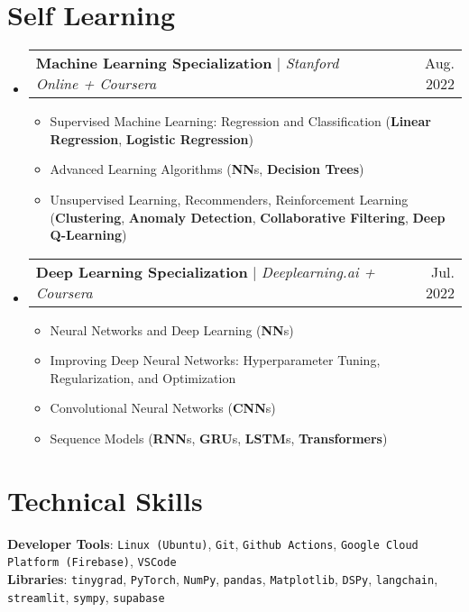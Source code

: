 \documentclass[letterpaper,11pt]{article}
\makeatletter
\newcommand{\resumeItem}[1]{
  \item\small{
    {#1 \vspace{-2pt}}
  }
}
\newcommand{\resumeProjectHeading}[2]{
    \item
    \begin{tabular*}{0.97\textwidth}{l@{\extracolsep{\fill}}r}
      \small#1 & #2 \\
    \end{tabular*}\vspace{-7pt}
}
\newcommand{\resumeSubHeadingListStart}{\begin{itemize}[leftmargin=0.15in, label={}]}
\newcommand{\resumeSubHeadingListEnd}{\end{itemize}}
\newcommand{\resumeItemListStart}{\begin{itemize}}
\newcommand{\resumeItemListEnd}{\end{itemize}\vspace{-5pt}}
\makeatother
\begin{document}
\section{Self Learning}
    \resumeSubHeadingListStart
      \resumeProjectHeading
          {\textbf{Machine Learning Specialization} $|$ \emph{Stanford Online + Coursera}}{Aug. 2022}
          \resumeItemListStart
                \resumeItem {Supervised Machine Learning: Regression and Classification (\textbf{Linear Regression}, \textbf{Logistic Regression})}
                \resumeItem {Advanced Learning Algorithms (\textbf{NN}s, \textbf{Decision Trees})}
                \resumeItem {Unsupervised Learning, Recommenders, Reinforcement Learning (\textbf{Clustering}, \textbf{Anomaly Detection}, \textbf{Collaborative Filtering}, \textbf{Deep Q-Learning})}
          \resumeItemListEnd
      \resumeProjectHeading
          {\textbf{Deep Learning Specialization} $|$ \emph{Deeplearning.ai + Coursera}}{Jul. 2022}
          \resumeItemListStart
                \resumeItem {Neural Networks and Deep Learning (\textbf{NN}s)}
                \resumeItem {Improving Deep Neural Networks: Hyperparameter Tuning, Regularization, and Optimization}
                \resumeItem {Convolutional Neural Networks (\textbf{CNN}s)}
                \resumeItem {Sequence Models (\textbf{RNN}s, \textbf{GRU}s, \textbf{LSTM}s, \textbf{Transformers})}
          \resumeItemListEnd
    \resumeSubHeadingListEnd


\section{Technical Skills}
  \begin{itemize}[leftmargin=0.15in, label={}]
    \small{\item{
    \textbf{Developer Tools}{: \texttt{Linux (Ubuntu)}, \texttt{Git}, \texttt{Github Actions}, \texttt{Google Cloud Platform (Firebase)}, \texttt{VSCode}} \\
    \textbf{Libraries}{: \texttt{tinygrad}, \texttt{PyTorch}, \texttt{NumPy}, \texttt{pandas}, \texttt{Matplotlib}, \texttt{DSPy}, \texttt{langchain}, \texttt{streamlit}, \texttt{sympy}, \texttt{supabase}}
    }}
  \end{itemize}
\end{document}
